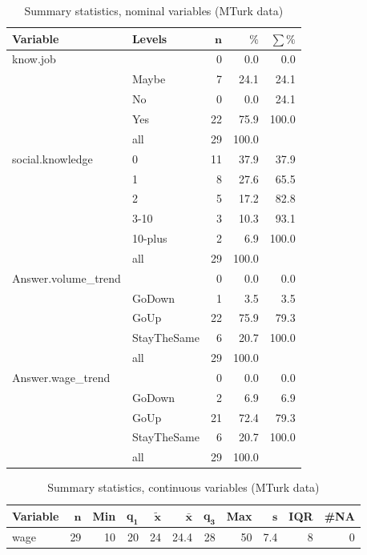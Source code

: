 \documentclass[a4paper,10pt]{article}\usepackage[]{graphicx}\usepackage[]{color}
\begin{document}
\begin{table}[ht]
\centering
{\footnotesize
\begin{tabular}{ll|rrr}
 \textbf{Variable} & \textbf{Levels} & $\mathbf{n}$ & $\mathbf{\%}$ & $\mathbf{\sum \%}$ \\ 
  \hline
know.job &  & 0 & 0.0 & 0.0 \\ 
   & Maybe & 7 & 24.1 & 24.1 \\ 
   & No & 0 & 0.0 & 24.1 \\ 
   & Yes & 22 & 75.9 & 100.0 \\ 
   \hline
 & all & 29 & 100.0 &  \\ 
   \hline
\hline
social.knowledge & 0 & 11 & 37.9 & 37.9 \\ 
   & 1 & 8 & 27.6 & 65.5 \\ 
   & 2 & 5 & 17.2 & 82.8 \\ 
   & 3-10 & 3 & 10.3 & 93.1 \\ 
   & 10-plus & 2 & 6.9 & 100.0 \\ 
   \hline
 & all & 29 & 100.0 &  \\ 
   \hline
\hline
Answer.volume\_trend &  & 0 & 0.0 & 0.0 \\ 
   & GoDown & 1 & 3.5 & 3.5 \\ 
   & GoUp & 22 & 75.9 & 79.3 \\ 
   & StayTheSame & 6 & 20.7 & 100.0 \\ 
   \hline
 & all & 29 & 100.0 &  \\ 
   \hline
\hline
Answer.wage\_trend &  & 0 & 0.0 & 0.0 \\ 
   & GoDown & 2 & 6.9 & 6.9 \\ 
   & GoUp & 21 & 72.4 & 79.3 \\ 
   & StayTheSame & 6 & 20.7 & 100.0 \\ 
   \hline
 & all & 29 & 100.0 &  \\ 
   \hline
\hline
\end{tabular}
}
\caption{Summary statistics, nominal variables (MTurk data)} 
\label{tab1:29-2060}
\end{table}
\begin{table}[ht]
\centering
{\footnotesize
\begin{tabular}{lrrrrrrrrrr}
 \textbf{Variable} & $\mathbf{n}$ & \textbf{Min} & $\mathbf{q_1}$ & $\mathbf{\widetilde{x}}$ & $\mathbf{\bar{x}}$ & $\mathbf{q_3}$ & \textbf{Max} & $\mathbf{s}$ & \textbf{IQR} & \textbf{\#NA} \\ 
  \hline
wage & 29 & 10 & 20 & 24 & 24.4 & 28 & 50 & 7.4 & 8 & 0 \\ 
  \end{tabular}
}
\caption{Summary statistics, continuous variables (MTurk data)} 
\label{tab2:29-2060}
\end{table}
\end{document}
